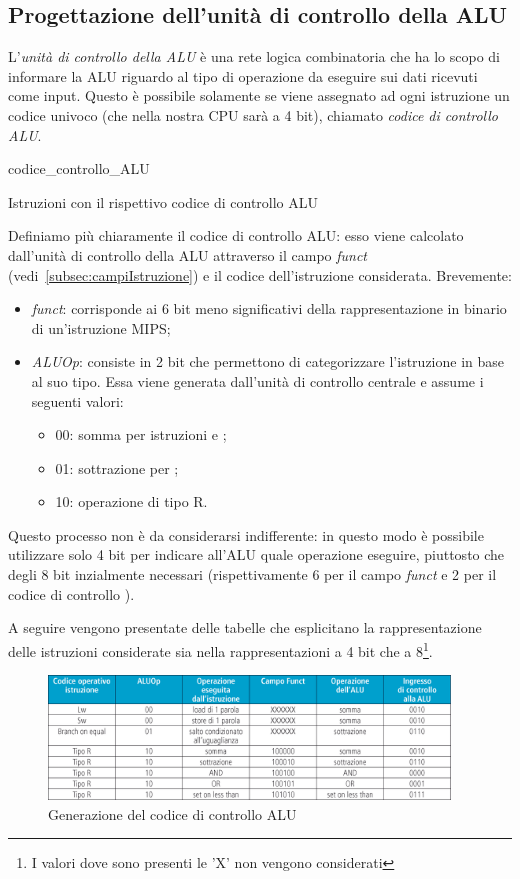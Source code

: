 \documentclass[class=book, crop=false, oneside]{standalone}
\begin{document}
\subsection{Progettazione dell'unità di controllo della ALU}
L'\emph{unità di controllo della ALU} è una rete logica combinatoria che ha lo scopo di informare la ALU riguardo al tipo di operazione da eseguire sui dati ricevuti come input. Questo è possibile solamente se viene assegnato ad ogni istruzione un codice univoco (che nella nostra CPU sarà a 4 bit), chiamato \emph{codice di controllo ALU}.

\begin{table}[!h]
	\centering
	{codice_controllo_ALU}
	\caption{Istruzioni con il rispettivo codice di controllo ALU}
\end{table}
Definiamo più chiaramente il codice di controllo ALU: esso viene calcolato dall'unità di controllo della ALU attraverso il campo \emph{funct} (vedi~\ref{subsec:campiIstruzione}) e il codice  dell'istruzione considerata. Brevemente:
\begin{itemize}
	\item \emph{funct}: corrisponde ai 6 bit meno significativi della rappresentazione in binario di un'istruzione MIPS;
	\item \emph{ALUOp}: consiste in 2 bit che permettono di categorizzare l'istruzione in base al suo tipo. Essa viene generata dall'unità di controllo centrale e assume i seguenti valori:
	\begin{itemize}
		\item 00: somma per istruzioni  e ;
		\item 01: sottrazione per ;
		\item 10: operazione di tipo R.
	\end{itemize}
\end{itemize}
Questo processo non è da considerarsi indifferente: in questo modo è possibile utilizzare solo 4 bit per indicare all'ALU quale operazione eseguire, piuttosto che degli 8 bit inzialmente necessari (rispettivamente 6 per il campo \emph{funct} e 2 per il codice di controllo ).

A seguire vengono presentate delle tabelle che esplicitano la rappresentazione delle istruzioni considerate sia nella rappresentazioni a 4 bit che a 8\footnote{I valori dove sono presenti le 'X' non vengono considerati}.

\begin{figure}[H]
	\centering
	\includegraphics[width=0.95\textwidth,keepaspectratio]{riassunto_controllo_ALU.png}
	\caption{Generazione del codice di controllo ALU}
\end{figure}
\end{document}
